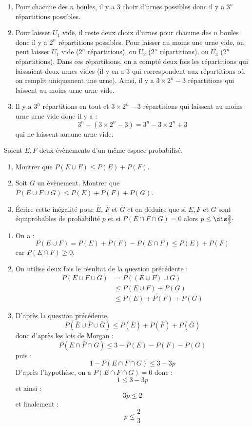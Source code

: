 \documentclass[a4paper,10pt]{report}
\begin{document}
\corr 

\begin{enumerate}
\item Pour chacune des $n$ boules, il y a $3$ choix d'urnes possibles donc il y a $3^n$ répartitions possibles.
\item Pour laisser $U_1$ vide, il reste deux choix d'urnes pour chacune des $n$ boules donc il y a $2^n$ répartitions possibles. Pour laisser au moins une urne vide, on peut laisser $U_1$ vide ($2^n$ répartitions), ou $U_2$  ($2^n$ répartitions), ou $U_3$  ($2^n$ répartitions). Dans ces répartitions, on a compté deux fois les répartitions qui laissaient deux urnes vides (il y en a $3$ qui correspondent aux répartitions où on remplit uniquement une urne). Ainsi, il y a $3 \times 2^n - 3$ répartitions qui laissent au moins urne urne vide.
\item Il y a $3^n$ répartitions en tout et $3 \times 2^n - 3$ répartitions qui laissent au moins urne urne vide donc il y a :
$$ 3^n - (3 \times 2^n - 3) = 3^n - 3 \times 2^n + 3$$
qui ne laissent aucune urne vide.
\end{enumerate}

\begin{Exercice}{}  Soient $E,F$ deux évènements d'un même espace probabilisé.
\begin{enumerate}
\item Montrer que $P(E \cup F) \leq P(E) + P(F)$.
\item Soit $G$ un évènement. Montrer que $P(E \cup F \cup G) \leq P(E) + P(F) + P(G)$.
\item Écrire cette inégalité pour $\overline{E}$, $\overline{F}$ et $\overline{G}$ et en déduire que si $E,F$ et $G$ sont équiprobables de probabilité $p$ et si $P(E \cap F \cap G)=0$ alors $p \leq \dis \frac{2}{3} \cdot$
\end{enumerate}
\end{Exercice}

\corr 
\begin{enumerate}
\item On a :
$$ P(E \cup F) = P(E) + P(F) - P(E \cap F) \leq P(E)+P(F)$$
car $P(E \cap F) \geq 0$.
\item On utilise deux fois le résultat de la question précédente :
\begin{align*}
P(E \cup F \cup G) & = P((E \cup F) \cup G) \\
& \leq P(E \cup F) + P(G) \\
& \leq P(E) + P(F) + P(G)
\end{align*}
\item D'après la question précédente,
$$ P(\overline{E} \cup \overline{F} \cup \overline{G})  \leq  P(\overline{E}) + P(\overline{F}) + P(\overline{G})$$
donc d'après les lois de Morgan :
$$ P(\overline{E \cap F \cap G}) \leq 3-P(E)-P(F)-P(G)$$
puis :
$$ 1-P(E \cap F \cap G) \leq 3-3p$$
D'après l'hypothèse, on a $P(E \cap F \cap G)=0$ donc :
$$ 1 \leq 3-3p$$
et ainsi :
$$3p \leq 2$$
et finalement :
$$ p \leq \dfrac{2}{3}$$
\end{enumerate}
\end{document}
